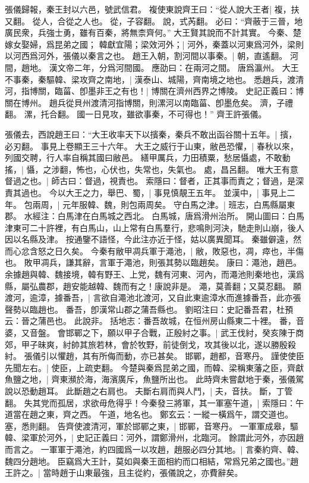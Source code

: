 張儀歸報，秦王封以六邑，號武信君。
複使東說齊王曰：“從人說大王者|{
	複，扶又翻。
	從人，合從之人也。
	從，子容翻。
	說，式芮翻。
}
必曰：“齊蔽于三晉，地廣民衆，兵強士勇，雖有百秦，將無柰齊何。”
大王賢其說而不計其實。
今秦、楚嫁女娶婦，爲昆弟之國；
韓獻宜陽；梁效河外；|{
	河外，秦蓋以河東爲河外，梁則以河西爲河外，張儀以秦言之也。
}
趙王入朝，割河間以事秦。|{
	朝，直遙翻。
	河間，趙地。
	漢文帝二年，分爲河間國。
	應劭曰：在兩河之間。
	唐爲瀛州。
}
大王不事秦，秦驅韓、梁攻齊之南地，|{
	漢泰山、城陽，齊南境之地也。
}
悉趙兵，渡清河，指博關，臨菑、卽墨非王之有也！|{
	博關在濟州西界之博陵。
	史記正義曰：博關在博州。
	趙兵從貝州渡清河指博關，則漯河以南臨菑、卽墨危矣。
	濟，子禮翻。
	漯，托合翻。
}
國一日見攻，雖欲事秦，不可得也！”
齊王許張儀。

張儀去，西說趙王曰：“大王收率天下以擯秦，秦兵不敢出函谷關十五年。|{
	擯，必刃翻。
	事見上卷顯王三十六年。
}
大王之威行于山東，敝邑恐懼，|{
	春秋以來，列國交聘，行人率自稱其國曰敝邑。
}
繕甲厲兵，力田積粟，愁居懾處，不敢動搖，|{
	懾，之涉翻，怖也，心伏也，失常也，失氣也。
	處，昌呂翻。
}
唯大王有意督過之也。|{
	師古曰：督過，視責也。
	索隱曰：督者，正其事而責之；督過，是深責其過也。
}
今以大王之力，舉巴、蜀，|{
	事見慎靚王五年。
}
並漢中，|{
	事見上二年。
}
包兩周，|{
	元年服韓、魏，則包兩周矣。
}
守白馬之津。|{
	班志，白馬縣屬東郡。
	水經注：白馬津在白馬城之西北。
	白馬城，唐爲滑州治所。
	開山圖曰：白馬津東可二十許裡，有白馬山，山上常有白馬羣行，悲鳴則河決，馳走則山崩，後人因以名縣及津。
	按通鑒不語怪，今此注亦近于怪，姑以廣異聞耳。
}
秦雖僻遠，然而心忿含怒之日久矣。
	今秦有敝甲凋兵軍于澠池，|{
	敝，敗惡也，凋，瘁也，半傷也。
	敗甲凋兵，謙其辭，言軍于澠池，則張其勢以臨趙矣。
	康曰：澠池，趙邑。
	余據趙與韓、魏接境，韓有野王、上党，魏有河東、河內，而澠池則秦地也，漢爲縣，屬弘農郡，趙安能越韓、魏而有之！康說非是。
	澠，莫善翻；又莫忍翻。
}
願渡河，逾漳，據番吾，|{
	言欲自澠池北渡河，又自此東逾漳水而進據番吾，此亦張聲勢以臨趙也。
	番吾，卽漢常山郡之蒲吾縣也。
	劉昭注曰：史記番吾君，杜預云：晉之蒲邑也。
	此說非。
	括地志：番吾故城，在恒州房山縣東二十裡。
	番，音婆，又音盤。
}
會邯鄲之下，願以甲子合戰，正殷紂之事。|{
	武王伐紂，癸亥陳于商郊，甲子昧爽，紂帥其旅若林，會於牧野，前徒倒戈，攻其後以北，遂以勝殷殺紂。
	張儀引以懼趙，其有所侮而動，亦已甚矣。
	邯鄲，趙都，音寒丹。
}
謹使使臣先聞左右。|{
	使臣，上疏吏翻。
}
今楚與秦爲昆弟之國，而韓、梁稱東藩之臣，齊獻魚鹽之地，|{
	齊東瀕於海，海濱廣斥，魚鹽所出也。
	此時齊未嘗獻地于秦，張儀駕說以恐動趙耳。
}
此斷趙之右肩也。
	夫斷右肩而與人鬥，|{
	夫，音扶。
	斷，丁管翻。
}
失其党而孤居，求欲毋危得乎！今秦發三將軍，其一軍塞午道，|{
	索隱曰：午道當在趙之東，齊之西。
	午道，地名也。
	鄭玄云：一縱一橫爲午，謂交道也。
	塞，悉則翻。
}
告齊使渡清河，軍於邯鄲之東，|{
	邯鄲，音寒丹。
}
一軍軍成皋，驅韓、梁軍於河外，|{
	史記正義曰：河外，謂鄭滑州，北臨河。
	餘謂此河外，亦因趙而言之。
}
一軍軍于澠池，約四國爲一以攻趙，趙服必四分其地。|{
	言秦約齊、韓、魏四分趙地。
}
臣竊爲大王計，莫如與秦王面相約而口相結，常爲兄弟之國也。”趙王許之。|{
	當時趙于山東最強，且主從約，張儀說之，亦費辭矣。
}

